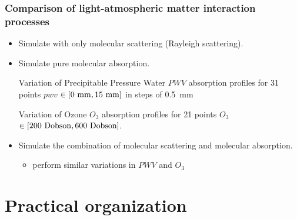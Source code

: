 \documentclass{beamer}
\begin{document}

\begin{frame}
\frametitle{Comparison of light-atmospheric matter interaction processes}
\begin{itemize}
\item Simulate with only molecular scattering (Rayleigh scattering). 
\item Simulate pure molecular absorption.
\begin{block}{Variation of Precipitable Pressure Water $PWV$}
 absorption profiles  for 31 points $pwv$ $\in \left[0~{\rm mm},15~{\rm mm} \right]$ in steps of 0.5~mm\end{block}
 \begin{block}{Variation of Ozone $O_3$}
 absorption profiles for  21 points $O_3$ $\in \left[200~{\rm Dobson},600~{\rm Dobson} \right]$.
\end{block}
\item Simulate the combination of molecular scattering and molecular absorption. 
\begin{itemize}
\item perform similar variations in $PWV$ and $O_3$
\end{itemize}
\end{itemize} 
\end{frame}


\section{Practical organization}
\end{document}
